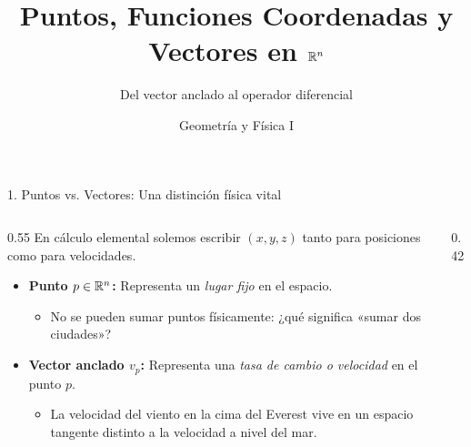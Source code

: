 \documentclass[10pt,aspectratio=169]{beamer}
\title[Semana 4: Vectores en el Espacio Euclidiano]{Puntos, Funciones Coordenadas y Vectores en $\mathbb{R}^n$}
\subtitle{Del vector anclado al operador diferencial}
\author{Geometría y Física I}
\institute{Licenciatura en Física}
\date{}
\begin{document}
\begin{frame}
  \titlepage
\end{frame}

\begin{frame}{1. Puntos vs. Vectores: Una distinción física vital}
  \begin{columns}[c]
    \begin{column}{0.55\textwidth}
      En cálculo elemental solemos escribir $(x, y, z)$ tanto para posiciones como para velocidades.
      \vspace{0.2cm}
      \begin{itemize}
        \item \textbf{Punto $p \in \mathbb{R}^n$:} Representa un \textit{lugar fijo} en el espacio.
        \begin{itemize}
          \item No se pueden sumar puntos físicamente: ¿qué significa «sumar dos ciudades»?
        \end{itemize}
        \vspace{0.15cm}
        \item \textbf{Vector anclado $v_p$:} Representa una \textit{tasa de cambio o velocidad} en el punto $p$.
        \begin{itemize}
          \item La velocidad del viento en la cima del Everest vive en un espacio tangente distinto a la velocidad a nivel del mar.
        \end{itemize}
      \end{itemize}
    \end{column}

    \begin{column}{0.42\textwidth}
      \centering
    \end{column}
  \end{columns}
\end{frame}
\end{document}
